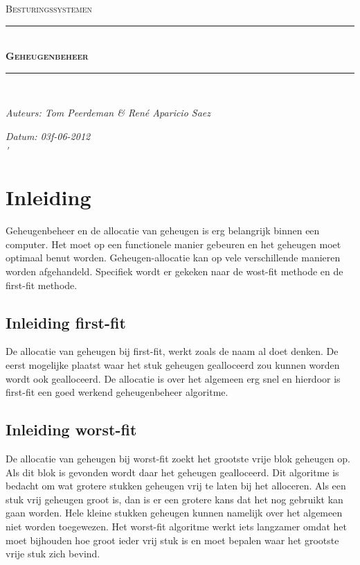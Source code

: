 \documentclass[a4paper]{article}
\newcommand{\HRule}{\rule{\linewidth}{0.5mm}}
\begin{document}
	\begin{titlepage}
	\begin{center}
		\textsc{\Large Besturingssystemen}\\[0.5cm]
		\HRule \\[0,4cm]
		\textsc{\huge \bfseries Geheugenbeheer}
		\HRule \\[8cm]
		\begin{minipage}{0.4\textwidth}
			\begin{flushleft}\large
				\emph{Auteurs: Tom Peerdeman \& Ren\'e Aparicio Saez}\\
			\end{flushleft}
		\end{minipage}
		\begin{minipage}{0.4\textwidth}
			\begin{flushright}\large
			\emph{Datum: 03f-06-2012\\\'}\\
			\end{flushright}
		\end{minipage}
	\end{center}
	\end{titlepage}

	\tableofcontents
	\newpage

	\section{Inleiding}\label{sec:inleiding}
	Geheugenbeheer en de allocatie van geheugen is erg belangrijk binnen een computer. Het moet op een functionele manier gebeuren en het geheugen moet optimaal benut worden. Geheugen-allocatie kan op vele verschillende manieren worden afgehandeld. Specifiek wordt er gekeken naar de wost-fit methode en de first-fit methode.

	\subsection{Inleiding first-fit}\label{sec:inleidingff}
	De allocatie van geheugen bij first-fit, werkt zoals de naam al doet denken. De eerst mogelijke plaatst waar het stuk geheugen gealloceerd zou kunnen worden wordt ook gealloceerd. De allocatie is over het algemeen erg snel en hierdoor is first-fit een goed werkend geheugenbeheer algoritme.

	\subsection{Inleiding worst-fit}\label{sec:inleidingwf}
	De allocatie van geheugen bij worst-fit zoekt het grootste vrije blok geheugen op. Als dit blok is gevonden wordt daar het geheugen gealloceerd. Dit algoritme is bedacht om wat grotere stukken geheugen vrij te laten bij het alloceren. Als een stuk vrij geheugen groot is, dan is er een grotere kans dat het nog gebruikt kan gaan worden. Hele kleine stukken geheugen kunnen namelijk over het algemeen niet worden toegewezen. Het worst-fit algoritme werkt iets langzamer omdat het moet bijhouden hoe groot ieder vrij stuk is en moet bepalen waar het grootste vrije stuk zich bevind.\\[1.5cm]
\end{document}
